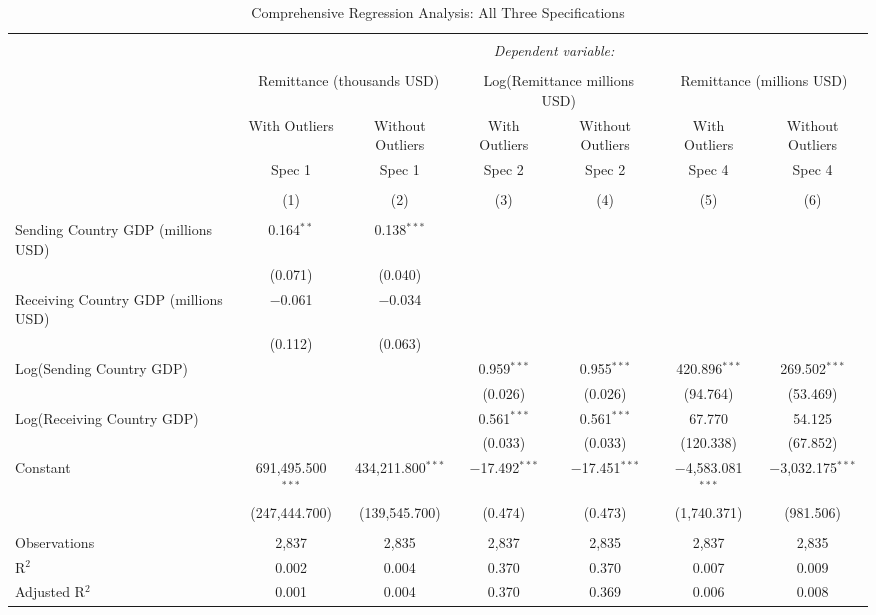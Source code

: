 
\begin{table}[!htbp] \centering
  \caption{Comprehensive Regression Analysis: All Three Specifications}
  \label{}
\begin{tabular}{@{\extracolsep{5pt}}lcccccc}
\\[-1.8ex]\hline
\hline \\[-1.8ex]
 & \multicolumn{6}{c}{\textit{Dependent variable:}} \\
\cline{2-7}
\\[-1.8ex] & \multicolumn{2}{c}{Remittance (thousands USD)} & \multicolumn{2}{c}{Log(Remittance millions USD)} & \multicolumn{2}{c}{Remittance (millions USD)} \\
 & With Outliers & Without Outliers & With Outliers & Without Outliers & With Outliers & Without Outliers \\
 & Spec 1 & Spec 1 & Spec 2 & Spec 2 & Spec 4 & Spec 4 \\
\\[-1.8ex] & (1) & (2) & (3) & (4) & (5) & (6)\\
\hline \\[-1.8ex]
 Sending Country GDP (millions USD) & 0.164$^{**}$ & 0.138$^{***}$ & & & & \\
  & (0.071) & (0.040) & & & & \\
 Receiving Country GDP (millions USD) & $-$0.061 & $-$0.034 & & & & \\
  & (0.112) & (0.063) & & & & \\
 Log(Sending Country GDP) & & & 0.959$^{***}$ & 0.955$^{***}$ & 420.896$^{***}$ & 269.502$^{***}$ \\
  & & & (0.026) & (0.026) & (94.764) & (53.469) \\
 Log(Receiving Country GDP) & & & 0.561$^{***}$ & 0.561$^{***}$ & 67.770 & 54.125 \\
  & & & (0.033) & (0.033) & (120.338) & (67.852) \\
 Constant & 691,495.500$^{***}$ & 434,211.800$^{***}$ & $-$17.492$^{***}$ & $-$17.451$^{***}$ & $-$4,583.081$^{***}$ & $-$3,032.175$^{***}$ \\
  & (247,444.700) & (139,545.700) & (0.474) & (0.473) & (1,740.371) & (981.506) \\
 \hline \\[-1.8ex]
Observations & 2,837 & 2,835 & 2,837 & 2,835 & 2,837 & 2,835 \\
R$^{2}$ & 0.002 & 0.004 & 0.370 & 0.370 & 0.007 & 0.009 \\
Adjusted R$^{2}$ & 0.001 & 0.004 & 0.370 & 0.369 & 0.006 & 0.008 \\

\end{tabular}
\end{table}
